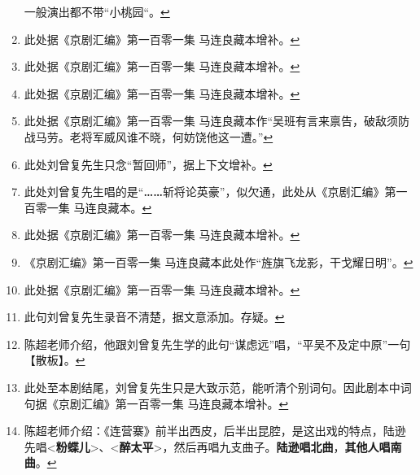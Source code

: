 \begin{enumerate}
  一般演出都不带``小桃园``。\protect\hyperlink{fnref200}{↩}
\item
  \leavevmode\hypertarget{fn201}{}%
  此处据《京剧汇编》第一百零一集
  马连良藏本增补。\protect\hyperlink{fnref201}{↩}
\item
  \leavevmode\hypertarget{fn202}{}%
  此处据《京剧汇编》第一百零一集
  马连良藏本增补。\protect\hyperlink{fnref202}{↩}
\item
  \leavevmode\hypertarget{fn203}{}%
  此处据《京剧汇编》第一百零一集
  马连良藏本增补。\protect\hyperlink{fnref203}{↩}
\item
  \leavevmode\hypertarget{fn204}{}%
  此处据《京剧汇编》第一百零一集
  马连良藏本作``吴班有言来禀告，破敌须防战马劳。老将军威风谁不晓，何妨饶他这一遭。''\protect\hyperlink{fnref204}{↩}
\item
  \leavevmode\hypertarget{fn205}{}%
  此处刘曾复先生只念``暂回师''，据上下文增补。\protect\hyperlink{fnref205}{↩}
\item
  \leavevmode\hypertarget{fn206}{}%
  此处刘曾复先生唱的是``\textbf{\ldots{}\ldots{}}斩将论英豪''，似欠通，此处从《京剧汇编》第一百零一集
  马连良藏本。\protect\hyperlink{fnref206}{↩}
\item
  \leavevmode\hypertarget{fn207}{}%
  此处据《京剧汇编》第一百零一集
  马连良藏本增补。\protect\hyperlink{fnref207}{↩}
\item
  \leavevmode\hypertarget{fn208}{}%
  《京剧汇编》第一百零一集
  马连良藏本此处作``旌旗飞龙影，干戈耀日明''。\protect\hyperlink{fnref208}{↩}
\item
  \leavevmode\hypertarget{fn209}{}%
  此处据《京剧汇编》第一百零一集
  马连良藏本增补。\protect\hyperlink{fnref209}{↩}
\item
  \leavevmode\hypertarget{fn210}{}%
  此句刘曾复先生录音不清楚，据文意添加。存疑。\protect\hyperlink{fnref210}{↩}
\item
  \leavevmode\hypertarget{fn211}{}%
  陈超老师介绍，他跟刘曾复先生学的此句``谋虑远''唱，``平吴不及定中原''一句【散板】。\protect\hyperlink{fnref211}{↩}
\item
  \leavevmode\hypertarget{fn212}{}%
  此处至本剧结尾，刘曾复先生只是大致示范，能听清个别词句。因此剧本中词句据《京剧汇编》第一百零一集
  马连良藏本增补。\protect\hyperlink{fnref212}{↩}
\item
  \leavevmode\hypertarget{fn213}{}%
  陈超老师介绍：《连营寨》前半出西皮，后半出昆腔，是这出戏的特点，陆逊先唱\textless{}\textbf{粉蝶儿}\textgreater{}、\textless{}\textbf{醉太平}\textgreater{}，然后再唱九支曲子。\textbf{陆逊唱北曲}，\textbf{其他人唱南曲}。\protect\hyperlink{fnref213}{↩}

\end{enumerate}
